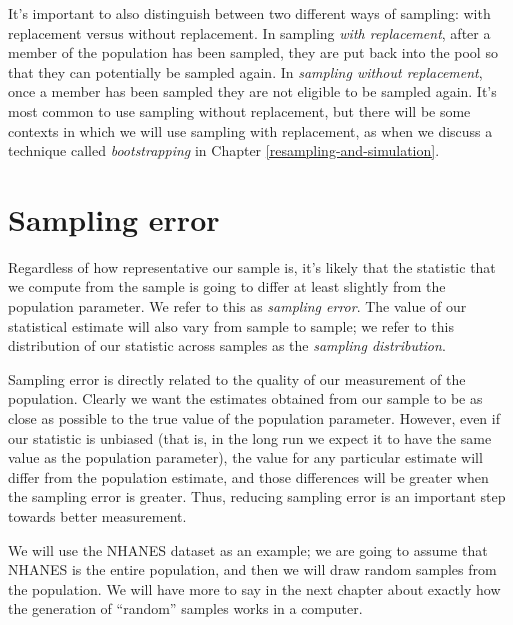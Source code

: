 \documentclass[]{book}
\theoremstyle{definition}
\theoremstyle{definition}
\theoremstyle{definition}
\theoremstyle{remark}
\begin{document}
It's important to also distinguish between two different ways of
sampling: with replacement versus without replacement. In sampling
\emph{with replacement}, after a member of the population has been
sampled, they are put back into the pool so that they can potentially be
sampled again. In \emph{sampling without replacement}, once a member has
been sampled they are not eligible to be sampled again. It's most common
to use sampling without replacement, but there will be some contexts in
which we will use sampling with replacement, as when we discuss a
technique called \emph{bootstrapping} in Chapter
\ref{resampling-and-simulation}.

\section{Sampling error}\label{sampling-error}

Regardless of how representative our sample is, it's likely that the
statistic that we compute from the sample is going to differ at least
slightly from the population parameter. We refer to this as
\emph{sampling error}. The value of our statistical estimate will also
vary from sample to sample; we refer to this distribution of our
statistic across samples as the \emph{sampling distribution}.

Sampling error is directly related to the quality of our measurement of
the population. Clearly we want the estimates obtained from our sample
to be as close as possible to the true value of the population
parameter. However, even if our statistic is unbiased (that is, in the
long run we expect it to have the same value as the population
parameter), the value for any particular estimate will differ from the
population estimate, and those differences will be greater when the
sampling error is greater. Thus, reducing sampling error is an important
step towards better measurement.

We will use the NHANES dataset as an example; we are going to assume
that NHANES is the entire population, and then we will draw random
samples from the population. We will have more to say in the next
chapter about exactly how the generation of ``random'' samples works in
a computer.
\end{document}
